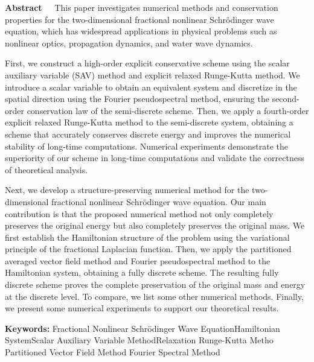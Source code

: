 \begin{EnglishAbstract}
\item {\bf Abstract\ \ } This paper investigates numerical methods and conservation properties for the two-dimensional fractional nonlinear Schr{\"o}dinger wave equation, which has widespread applications in physical problems such as nonlinear optics, propagation dynamics, and water wave dynamics.

First, we construct a high-order explicit conservative scheme using the scalar auxiliary variable (SAV) method and explicit relaxed Runge-Kutta method. We introduce a scalar variable to obtain an equivalent system and discretize in the spatial direction using the Fourier pseudospectral method, ensuring the second-order conservation law of the semi-discrete scheme. Then, we apply a fourth-order explicit relaxed Runge-Kutta method to the semi-discrete system, obtaining a scheme that accurately conserves discrete energy and improves the numerical stability of long-time computations.
Numerical experiments demonstrate the superiority of our scheme in long-time computations and validate the correctness of theoretical analysis.

Next, we develop a structure-preserving numerical method for the two-dimensional fractional nonlinear Schr{\"o}dinger wave equation. Our main contribution is that the proposed numerical method not only completely preserves the original energy but also completely preserves the original mass.
We first establish the Hamiltonian structure of the problem using the variational principle of the fractional Laplacian function. Then, we apply the partitioned averaged vector field method and Fourier pseudospectral method to the Hamiltonian system, obtaining a fully discrete scheme. The resulting fully discrete scheme proves the complete preservation of the original mass and energy at the discrete level.
To compare, we list some other numerical methods. Finally, we present some numerical experiments to support our theoretical results.
\item {\bf Keywords:} Fractional Nonlinear Schr{\"o}dinger Wave Equation\qquad Hamiltonian System\qquad Scalar Auxiliary Variable Method\qquad Relaxation Runge-Kutta Metho \qquad Partitioned Vector Field Method \qquad Fourier Spectral Method
\end{EnglishAbstract}